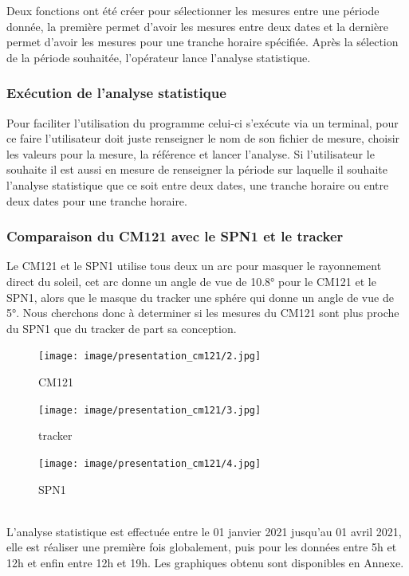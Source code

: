 \documentclass[12pt,a4paper]{article}
\begin{document}
\begin{flushleft}
Deux fonctions ont été créer pour sélectionner les mesures entre une période donnée, la première permet d'avoir les mesures entre deux dates et la dernière permet d'avoir les mesures pour une tranche horaire spécifiée. Après la sélection de la période souhaitée, l'opérateur lance l'analyse statistique.

\subsubsection{Exécution de l'analyse statistique}

Pour faciliter l'utilisation du programme celui-ci s'exécute via un terminal, pour ce faire l'utilisateur doit juste renseigner le nom de son fichier de mesure, choisir les valeurs pour la mesure, la référence et lancer l'analyse. Si l'utilisateur le souhaite il est aussi en mesure de renseigner la période sur laquelle il souhaite l'analyse statistique que ce soit entre deux dates, une tranche horaire ou entre deux dates pour une tranche horaire.


\subsubsection{Comparaison du CM121 avec le SPN1 et le tracker}

Le CM121 et le SPN1 utilise tous deux un arc pour masquer le rayonnement direct du soleil, cet arc donne un angle de vue de 10.8° pour le CM121 et le SPN1, alors que le masque du tracker une sphére qui donne un angle de vue de 5°. Nous cherchons donc à determiner si les mesures du CM121 sont plus proche du SPN1 que du tracker de part sa conception.

\begin{figure}[H]
    \begin{minipage}[c]{.2\linewidth}
        \centering
        \texttt{[image: image/presentation\_cm121/2.jpg]}  
        \caption{CM121}
    \end{minipage}
    \hfill%
    \begin{minipage}[c]{.2\linewidth}
        \centering
        \texttt{[image: image/presentation\_cm121/3.jpg]}  
        \caption{tracker}
    \end{minipage}
    \hfill%
    \begin{minipage}[c]{.3\linewidth}
        \centering
        \texttt{[image: image/presentation\_cm121/4.jpg]} 
        \caption{SPN1}
    \end{minipage}
\end{figure}
~\\
L'analyse statistique est effectuée entre le 01 janvier 2021 jusqu'au 01 avril 2021, elle est réaliser une première fois globalement, puis pour les données entre 5h et 12h et enfin entre 12h et 19h. Les graphiques obtenu sont disponibles en Annexe.
~\\




\end{flushleft}
\end{document}
